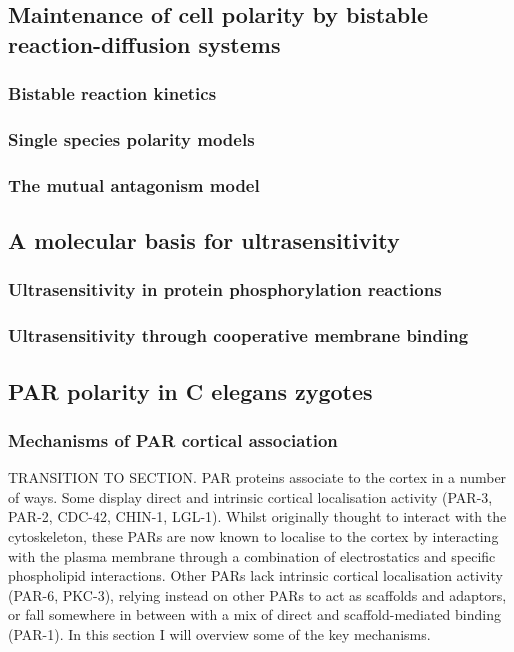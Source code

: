 \documentclass[12pt]{"article"}
\begin{document}
\clearpage
\subsection{Maintenance of cell polarity by bistable reaction-diffusion systems}
\subsubsection{Bistable reaction kinetics}
\subsubsection{Single species polarity models}
\subsubsection{The mutual antagonism model}

\clearpage
\subsection{A molecular basis for ultrasensitivity}
\subsubsection{Ultrasensitivity in protein phosphorylation reactions}
\subsubsection{Ultrasensitivity through cooperative membrane binding}

\clearpage
\subsection{PAR polarity in C elegans zygotes}

\subsubsection{Mechanisms of PAR cortical association}

TRANSITION TO SECTION. PAR proteins associate to the cortex in a number of ways. Some display direct and intrinsic cortical localisation activity (PAR-3, PAR-2, CDC-42, CHIN-1, LGL-1). Whilst originally thought to interact with the cytoskeleton, these PARs are now known to localise to the cortex by interacting with the plasma membrane through a combination of electrostatics and specific phospholipid interactions. Other PARs lack intrinsic cortical localisation activity (PAR-6, PKC-3), relying instead on other PARs to act as scaffolds and adaptors, or fall somewhere in between with a mix of direct and scaffold-mediated binding (PAR-1). In this section I will overview some of the key mechanisms.\\
\end{document}
